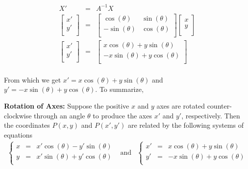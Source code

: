 \[ \begin{array}{rcl}

X'& = & A^{-1} X \\ [5pt]
\left[ \begin{array}{c}x' \\ y'\\ \end{array} \right] & = & \left[ \begin{array}{rr} \cos(\theta) & \sin(\theta) \\ -\sin(\theta) & \cos(\theta) \\ \end{array} \right]\left[ \begin{array}{c}x \\ y\\ \end{array} \right] \\ [15pt]

\left[ \begin{array}{c}x' \\ y'\\ \end{array} \right] & = & \left[ \begin{array}{c}x \cos(\theta) + y\sin(\theta) \\- x \sin(\theta) + y\cos(\theta)  \\ \end{array} \right] \\ \end{array} \]

From which we get $x' = x \cos(\theta) + y\sin(\theta)$ and $y'=- x \sin(\theta) + y\cos(\theta)$.   To summarize, 

\medskip

\colorbox{ResultColor}{\bbm  

\begin{thm} \label{rotatecoordinatesthm}  \textbf{Rotation of Axes:}  Suppose the positive $x$ and $y$ axes are rotated counter-clockwise through an angle $\theta$ to produce the axes $x'$ and $y'$, respectively.  Then the coordinates $P(x,y)$ and $P(x',y')$ are related by the following systems of equations
\[ \begin{array}{ccc}

\left\{  \begin{array}{rcl}x & = & x' \cos(\theta) - y' \sin(\theta) \\ y& = &  x'\sin(\theta) + y'\cos(\theta)  \\ \end{array} \right. &

\text{and}

&

\left\{ \begin{array}{rcl} x' & = & x \cos(\theta) + y \sin(\theta) \\ y' & = &  -x\sin(\theta) +y\cos(\theta)  \\ \end{array} \right.  

\\ \end{array} \]


\end{thm}

\ebm}

